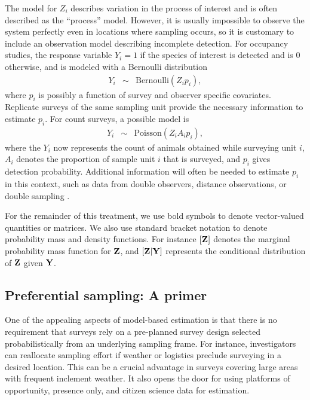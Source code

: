\documentclass[times,mee,doublespace,]{besauth2}
\begin{document}
The model for $Z_i$ describes variation in the process of interest and is often described as the ``process'' model.  However, it is usually impossible to observe the system perfectly even in locations where sampling occurs, so it is customary to include an observation model describing incomplete detection.  For occupancy studies, the response variable $Y_i = 1$ if the species of interest is detected and is 0 otherwise, and is modeled with a Bernoulli distribution \citep{Royle2008}
\begin{eqnarray}
  Y_i & \sim & \text{Bernoulli}(Z_i p_i),
\end{eqnarray}
where $p_i$ is possibly a function of survey and observer specific covariates. Replicate surveys of the same sampling unit provide the necessary information to estimate $p_i$.   For count surveys, a possible model is
\begin{eqnarray}
  \label{eq:obs_pois}
  Y_i & \sim & \text{Poisson}(Z_i A_i p_i),
\end{eqnarray}
where the $Y_i$ now represents the count of animals obtained while surveying unit $i$, $A_i$ denotes the proportion of sample unit $i$ that is surveyed, and $p_i$ gives detection probability.  Additional information will often be needed to estimate $p_i$ in this context, such as data from double observers, distance observations, or double sampling \citep[see e.g.][]{BucklandEtAl2001,Royle2004,Borchers2006,ConnEtAl2014}.

For the remainder of this treatment, we use bold symbols to denote vector-valued quantities or matrices.  We also use standard bracket notation to denote probability mass and density functions.  For instance $[{\bf Z}]$ denotes the marginal probability mass function for ${\bf Z}$, and  $[{\bf Z}|{\bf Y}]$ represents the conditional distribution of ${\bf Z}$ given ${\bf Y}$.

\subsection{Preferential sampling: A primer}

One of the appealing aspects of model-based estimation is that there is no requirement that surveys rely on a pre-planned survey design selected probabilistically from an underlying sampling frame.  For instance, investigators can reallocate sampling effort if weather or logistics preclude surveying in a desired location.  This can be a crucial advantage in surveys covering large areas with frequent inclement weather.  It also opens the door for using platforms of opportunity, presence only, and citizen science data for estimation.
\end{document}
